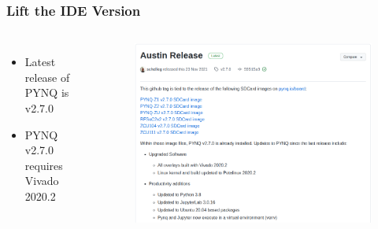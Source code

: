\documentclass[aspectratio=169]{beamer}
\begin{document}
\begin{frame}
    \frametitle{Lift the IDE Version}

    \begin{columns}
        \begin{itemize}
            \item Latest release of PYNQ is v2.7.0
            \item PYNQ v2.7.0 requires Vivado 2020.2
        \end{itemize}

        \begin{figure}
            \includegraphics[scale=0.32]{images/pynq-release.png}
        \end{figure}
    \end{columns}
\end{frame}
\end{document}
